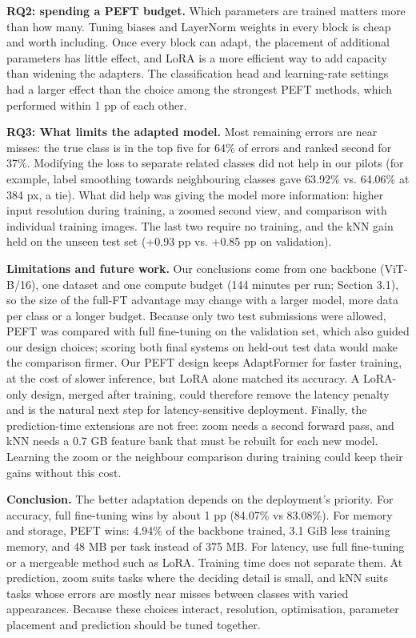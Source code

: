 \textbf{RQ2: spending a PEFT budget.} Which parameters are trained matters more than how many. Tuning biases and LayerNorm weights in every block is cheap and worth including. Once every block can adapt, the placement of additional parameters has little effect, and LoRA is a more efficient way to add capacity than widening the adapters. The classification head and learning-rate settings had a larger effect than the choice among the strongest PEFT methods, which performed within 1 pp of each other.

\textbf{RQ3: What limits the adapted model.} Most remaining errors are near misses: the true class is in the top five for 64\% of errors and ranked second for 37\%. Modifying the loss to separate related classes did not help in our pilots (for example, label smoothing towards neighbouring classes gave 63.92\% vs. 64.06\% at 384 px, a tie). What did help was giving the model more information: higher input resolution during training, a zoomed second view, and comparison with individual training images. The last two require no training, and the kNN gain held on the unseen test set (+0.93 pp vs. +0.85 pp on validation).

\textbf{Limitations and future work.} Our conclusions come from one backbone (ViT-B/16), one dataset and one compute budget (144 minutes per run; Section 3.1), so the size of the full-FT advantage may change with a larger model, more data per class or a longer budget. Because only two test submissions were allowed, PEFT was compared with full fine-tuning on the validation set, which also guided our design choices; scoring both final systems on held-out test data would make the comparison firmer. Our PEFT design keeps AdaptFormer for faster training, at the cost of slower inference, but LoRA alone matched its accuracy. A LoRA-only design, merged after training, could therefore remove the latency penalty and is the natural next step for latency-sensitive deployment. Finally, the prediction-time extensions are not free: zoom needs a second forward pass, and kNN needs a 0.7 GB feature bank that must be rebuilt for each new model. Learning the zoom or the neighbour comparison during training could keep their gains without this cost.

\textbf{Conclusion.} The better adaptation depends on the deployment's priority. For accuracy, full fine-tuning wins by about 1 pp (84.07\% vs 83.08\%). For memory and storage, PEFT wins: 4.94\% of the backbone trained, 3.1 GiB less training memory, and 48 MB per task instead of 375 MB. For latency, use full fine-tuning or a mergeable method such as LoRA. Training time does not separate them. At prediction, zoom suits tasks where the deciding detail is small, and kNN suits tasks whose errors are mostly near misses between classes with varied appearances. Because these choices interact, resolution, optimisation, parameter placement and prediction should be tuned together.


